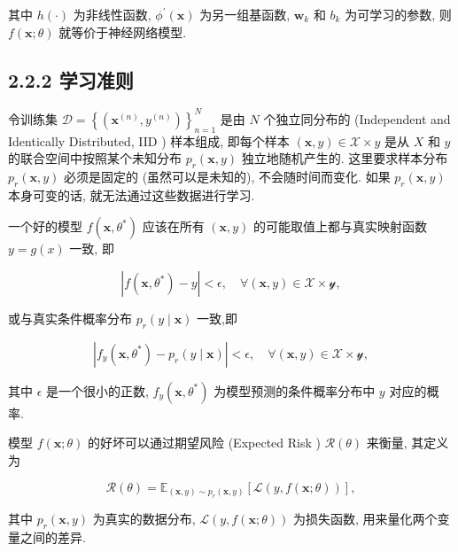 \documentclass[10pt]{article}
\begin{document}
其中 $h(\cdot)$ 为非线性函数, $\phi^{\prime}(\boldsymbol{x})$ 为另一组基函数, $\boldsymbol{w}_{k}$ 和 $b_{k}$ 为可学习的参数, 则 $f(\boldsymbol{x} ; \theta)$ 就等价于神经网络模型.

\subsection*{2.2.2 学习准则}
令训练集 $\mathcal{D}=\left\{\left(\boldsymbol{x}^{(n)}, y^{(n)}\right)\right\}_{n=1}^{N}$ 是由 $N$ 个独立同分布的 (Independent and Identically Distributed, IID ) 样本组成, 即每个样本 $(\boldsymbol{x}, y) \in \mathcal{X} \times y$ 是从 $X$ 和 $y$的联合空间中按照某个未知分布 $p_{r}(\boldsymbol{x}, y)$ 独立地随机产生的. 这里要求样本分布 $p_{r}(\boldsymbol{x}, y)$ 必须是固定的 (虽然可以是未知的), 不会随时间而变化. 如果 $p_{r}(\boldsymbol{x}, y)$本身可变的话, 就无法通过这些数据进行学习.

一个好的模型 $f\left(\boldsymbol{x}, \theta^{*}\right)$ 应该在所有 $(\boldsymbol{x}, y)$ 的可能取值上都与真实映射函数 $y=g(x)$ 一致, 即


\begin{equation*}
\left|f\left(\boldsymbol{x}, \theta^{*}\right)-y\right|<\epsilon, \quad \forall(\boldsymbol{x}, y) \in \mathcal{X} \times \mathcal{y}, \tag{2.9}
\end{equation*}


或与真实条件概率分布 $p_{r}(y \mid \boldsymbol{x})$ 一致,即


\begin{equation*}
\left|f_{y}\left(\boldsymbol{x}, \theta^{*}\right)-p_{r}(y \mid \boldsymbol{x})\right|<\epsilon, \quad \forall(\boldsymbol{x}, y) \in \mathcal{X} \times \mathcal{y}, \tag{2.10}
\end{equation*}


其中 $\epsilon$ 是一个很小的正数, $f_{y}\left(\boldsymbol{x}, \theta^{*}\right)$ 为模型预测的条件概率分布中 $y$ 对应的概率.

模型 $f(\boldsymbol{x} ; \theta)$ 的好坏可以通过期望风险 (Expected Risk ) $\mathcal{R}(\theta)$ 来衡量, 其定义为


\begin{equation*}
\mathcal{R}(\theta)=\mathbb{E}_{(\boldsymbol{x}, y) \sim p_{r}(\boldsymbol{x}, y)}[\mathcal{L}(y, f(\boldsymbol{x} ; \theta))], \tag{2.11}
\end{equation*}


其中 $p_{r}(\boldsymbol{x}, y)$ 为真实的数据分布, $\mathcal{L}(y, f(\boldsymbol{x} ; \theta))$ 为损失函数, 用来量化两个变量之间的差异.
\end{document}
